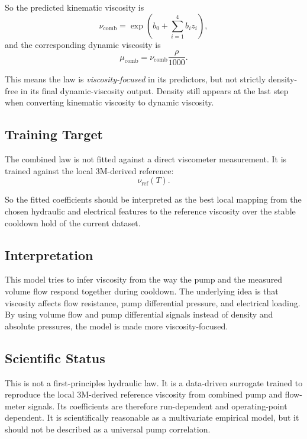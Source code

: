 \documentclass[11pt]{article}
\begin{document}
So the predicted kinematic viscosity is
\begin{equation}
    \nu_{\mathrm{comb}} = \exp\!\left(b_0 + \sum_{i=1}^{4} b_i z_i\right),
\end{equation}
and the corresponding dynamic viscosity is
\begin{equation}
    \mu_{\mathrm{comb}} = \nu_{\mathrm{comb}}\frac{\rho}{1000}.
\end{equation}

This means the law is \emph{viscosity-focused} in its predictors, but not
strictly density-free in its final dynamic-viscosity output. Density still
appears at the last step when converting kinematic viscosity to dynamic
viscosity.

\subsection{Training Target}

The combined law is not fitted against a direct viscometer measurement. It is
trained against the local 3M-derived reference:
\begin{equation}
    \nu_{\mathrm{ref}}(T).
\end{equation}

So the fitted coefficients should be interpreted as the best local mapping from
the chosen hydraulic and electrical features to the reference viscosity over
the stable cooldown hold of the current dataset.

\subsection{Interpretation}

This model tries to infer viscosity from the way the pump and the measured
volume flow respond together during cooldown. The underlying idea is that
viscosity affects flow resistance, pump differential pressure, and electrical
loading. By using volume flow and pump differential signals instead of density
and absolute pressures, the model is made more viscosity-focused.

\subsection{Scientific Status}

This is not a first-principles hydraulic law. It is a data-driven surrogate
trained to reproduce the local 3M-derived reference viscosity from combined
pump and flow-meter signals. Its coefficients are therefore run-dependent and
operating-point dependent. It is scientifically reasonable as a multivariate
empirical model, but it should not be described as a universal pump
correlation.
\end{document}
